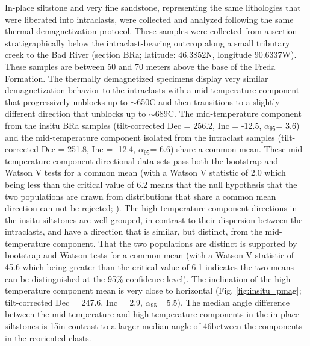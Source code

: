 \documentclass[draft]{agujournal2018}
\begin{document}
In-place siltstone and very fine sandstone, representing the same lithologies that were liberated into intraclasts, were collected and analyzed following the same thermal demagnetization protocol. These samples were collected from a section stratigraphically below the intraclast-bearing outcrop along a small tributary creek to the Bad River (section BRa; latitude: 46.3852\textdegree N, longitude 90.6337\textdegree W). These samples are between 50 and 70 meters above the base of the Freda Formation. The thermally demagnetized specimens display very similar demagnetization behavior to the intraclasts with a mid-temperature component that progressively unblocks up to $\sim$650\textdegree C and then transitions to a slightly different direction that unblocks up to $\sim$689\textdegree C. The mid-temperature component from the insitu BRa samples (tilt-corrected Dec = 256.2, Inc = -12.5, $\alpha_{95}$= 3.6) and the mid-temperature component isolated from the intraclast samples (tilt-corrected Dec = 251.8, Inc = -12.4, $\alpha_{95}$= 6.6) share a common mean. These mid-temperature component directional data sets pass both the bootstrap and Watson V tests for a common mean (with a Watson V statistic of 2.0 which being less than the critical value of 6.2 means that the null hypothesis that the two populations are drawn from distributions that share a common mean direction can not be rejected; \citealp{Watson1983a}). The high-temperature component directions in the insitu siltstones are well-grouped, in contrast to their dispersion between the intraclasts, and have a direction that is similar, but distinct, from the mid-temperature component. That the two populations are distinct is supported by bootstrap and Watson tests for a common mean (with a Watson V statistic of 45.6 which being greater than the critical value of 6.1 indicates the two means can be distinguished at the 95\% confidence level). The inclination of the high-temperature component mean is very close to horizontal (Fig. \ref{fig:insitu_pmag}; tilt-corrected Dec = 247.6, Inc = 2.9, $\alpha_{95}$= 5.5). The median angle difference between the mid-temperature and high-temperature components in the in-place siltstones is 15\textdegree in contrast to a larger median angle of 46\textdegree between the components in the reoriented clasts.
\end{document}
